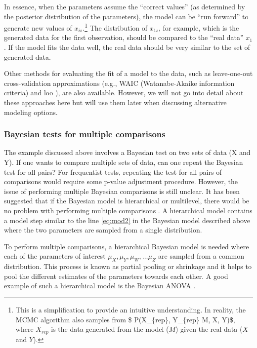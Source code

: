 \documentclass[twoside,11pt,preprint]{article}
\begin{document}
In essence, when the parameters assume the ``correct values'' (as determined by the posterior distribution of the parameters), the model can be ``run forward'' to generate new values of \(x_{is}\).\footnote{This is a simplification to provide an intuitive understanding. In reality, the MCMC algorithm also samples from \$ P(X\_\{rep\}, Y\_\{rep\} \textbar{} M, X, Y)\$, where \(X_{rep}\) is the data generated from the model (\(M\)) given the real data (\(X\) and \(Y\)).} The distribution of \(x_{1s}\), for example, which is the generated data for the first observation, should be compared to the ``real data'' \(x_1\). If the model fits the data well, the real data should be very similar to the set of generated data.

Other methods for evaluating the fit of a model to the data, such as leave-one-out cross-validation approximations (e.g., WAIC (Watanabe-Akaike information criteria) \citep{watanabe2010asymptotic} and loo \citep{vehtari2017practical}), are also available. However, we will not go into detail about these approaches here but will use them later when discussing alternative modeling options.

\hypertarget{bayesian-tests-for-multiple-comparisons}{%
\subsubsection{Bayesian tests for multiple comparisons}\label{bayesian-tests-for-multiple-comparisons}}

The example discussed above involves a Bayesian test on two sets of data (X and Y). If one wants to compare multiple sets of data, can one repeat the Bayesian test for all pairs? For frequentist tests, repeating the test for all pairs of comparisons would require some p-value adjustment procedure. However, the issue of performing multiple Bayesian comparisons is still unclear. It has been suggested that if the Bayesian model is hierarchical or multilevel, there would be no problem with performing multiple comparisons \citep{gelman2012we}. A hierarchical model
contains a model step similar to the line \ref{eq:mod2} in the Bayesian model described
above where the two parameters are sampled from a single distribution.

To perform multiple comparisons, a hierarchical Bayesian model is needed where each of the parameters of interest \(\mu_X, \mu_Y, \mu_W, \ldots \mu_Z\) are sampled from a common distribution. This process is known as partial pooling or shrinkage and it helps to pool the different estimates of the parameters towards each other. A good example of such a hierarchical model is the Bayesian ANOVA \citep[ch.~19]{kruschke2014doing}.
\end{document}
